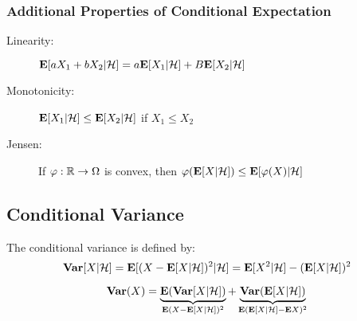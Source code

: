 \documentclass[../main/main.tex]{subfiles}
\begin{document}
\subsubsection{Additional Properties of Conditional Expectation}
\begin{description}
	\item[Linearity:] $\E[a X_1 + b X_2 | \H] = a \E[X_1 | \H] + B\E[X_2|\H]$
	\item[Monotonicity:] $\E[X_1|\H] \leq \E[X_2 | \H]$ if $X_1 \leq X_2$
	\item[Jensen:] If $\varphi: \R \to \Omega$ is convex, then $\varphi(\E[X|\H])\leq \E[\varphi(X) | \H]$
\end{description}

\subsection{Conditional Variance}
\begin{definition} The conditional variance is defined by: \[
		\Var[X|\H] = \E[(X - \E[X | \H])^2 | \H] = \E[X^2 | \H] - (\E[X|\H])^2
	\]
\end{definition}
\begin{theorem} \[
		\Var(X) = \underbrace{\E(\Var[X|\H])}_{\E(X-\E[X|\H])^2} + \underbrace{\Var(\E[X|\H])}_{\E(\E[X|\H]-\E X)^2}
	\]
\end{theorem}
\end{document}
